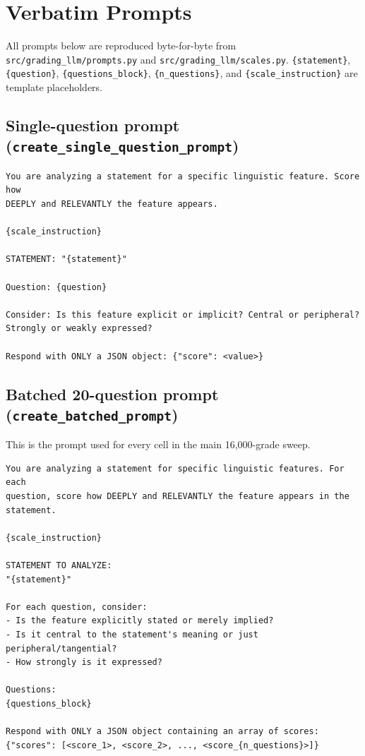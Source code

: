 \documentclass[11pt]{article}
\begin{document}
\section{Verbatim Prompts}
\label{app:prompts}

All prompts below are reproduced byte-for-byte from \texttt{src/grading\_llm/prompts.py} and \texttt{src/grading\_llm/scales.py}. \texttt{\{statement\}}, \texttt{\{question\}}, \texttt{\{questions\_block\}}, \texttt{\{n\_questions\}}, and \texttt{\{scale\_instruction\}} are template placeholders.

\subsection{Single-question prompt (\texttt{create\_single\_question\_prompt})}
\begin{verbatim}
You are analyzing a statement for a specific linguistic feature. Score how
DEEPLY and RELEVANTLY the feature appears.

{scale_instruction}

STATEMENT: "{statement}"

Question: {question}

Consider: Is this feature explicit or implicit? Central or peripheral?
Strongly or weakly expressed?

Respond with ONLY a JSON object: {"score": <value>}
\end{verbatim}

\subsection{Batched 20-question prompt (\texttt{create\_batched\_prompt})}
This is the prompt used for every cell in the main 16{,}000-grade sweep.
\begin{verbatim}
You are analyzing a statement for specific linguistic features. For each
question, score how DEEPLY and RELEVANTLY the feature appears in the
statement.

{scale_instruction}

STATEMENT TO ANALYZE:
"{statement}"

For each question, consider:
- Is the feature explicitly stated or merely implied?
- Is it central to the statement's meaning or just peripheral/tangential?
- How strongly is it expressed?

Questions:
{questions_block}

Respond with ONLY a JSON object containing an array of scores:
{"scores": [<score_1>, <score_2>, ..., <score_{n_questions}>]}
\end{verbatim}
\end{document}
